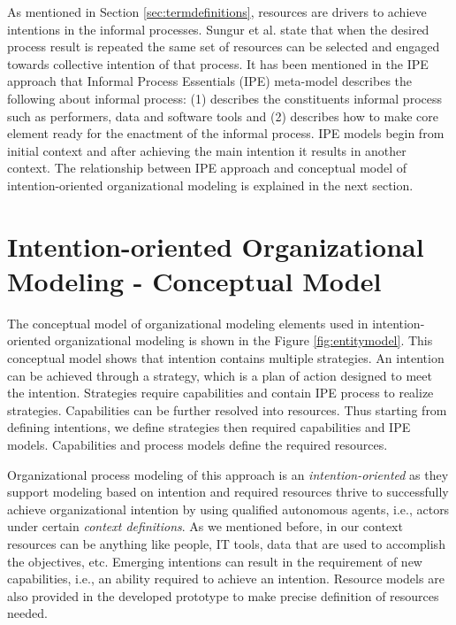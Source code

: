 As mentioned in Section \ref{sec:termdefinitions}, resources are drivers to achieve intentions in the informal processes. Sungur et al. \cite{Sungur2014a} state that when the desired process result is repeated the same set of resources can be selected and engaged towards collective intention of that process. It has been mentioned in the IPE approach that Informal Process Essentials (IPE) meta-model describes the following about informal process: (1) describes the constituents informal process such as performers, data and software tools and (2) describes how to make core element ready for the enactment of the informal process. IPE models begin from initial context and after achieving the main intention it results in another context. The relationship between IPE approach and conceptual model of intention-oriented organizational modeling is explained in the next section.

\section{Intention-oriented Organizational Modeling - Conceptual Model}
\label{sec:entitytypesrepresentation}
The conceptual model of organizational modeling elements used in intention-oriented organizational modeling is shown in the Figure \ref{fig:entitymodel}. This conceptual model shows that intention contains multiple strategies. An intention can be achieved through a strategy, which is a plan of action designed to meet the intention. Strategies require capabilities and contain IPE process to realize strategies. Capabilities can be further resolved into resources. Thus starting from defining intentions, we define strategies then required capabilities and IPE models. Capabilities and process models define the required resources. 

Organizational process modeling of this approach is an \textit{intention-oriented} as they support modeling based on intention and required resources thrive to successfully achieve organizational intention by using qualified autonomous agents, i.e., actors under certain \textit{context definitions}. As we mentioned before, in our context resources can be anything like people, IT tools, data that are used to accomplish the objectives, etc. Emerging intentions can result in the requirement of new capabilities, i.e., an ability required to achieve an intention. Resource models are also provided in the developed prototype to make precise definition of resources needed.

